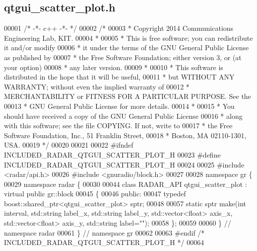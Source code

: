 \subsection{qtgui\+\_\+scatter\+\_\+plot.\+h}
\label{qtgui__scatter__plot_8h_source}

\begin{DoxyCode}
00001 \textcolor{comment}{/* -*- c++ -*- */}
00002 \textcolor{comment}{/* }
00003 \textcolor{comment}{ * Copyright 2014 Communications Engineering Lab, KIT.}
00004 \textcolor{comment}{ * }
00005 \textcolor{comment}{ * This is free software; you can redistribute it and/or modify}
00006 \textcolor{comment}{ * it under the terms of the GNU General Public License as published by}
00007 \textcolor{comment}{ * the Free Software Foundation; either version 3, or (at your option)}
00008 \textcolor{comment}{ * any later version.}
00009 \textcolor{comment}{ * }
00010 \textcolor{comment}{ * This software is distributed in the hope that it will be useful,}
00011 \textcolor{comment}{ * but WITHOUT ANY WARRANTY; without even the implied warranty of}
00012 \textcolor{comment}{ * MERCHANTABILITY or FITNESS FOR A PARTICULAR PURPOSE.  See the}
00013 \textcolor{comment}{ * GNU General Public License for more details.}
00014 \textcolor{comment}{ * }
00015 \textcolor{comment}{ * You should have received a copy of the GNU General Public License}
00016 \textcolor{comment}{ * along with this software; see the file COPYING.  If not, write to}
00017 \textcolor{comment}{ * the Free Software Foundation, Inc., 51 Franklin Street,}
00018 \textcolor{comment}{ * Boston, MA 02110-1301, USA.}
00019 \textcolor{comment}{ */}
00020 
00021 
00022 \textcolor{preprocessor}{#ifndef INCLUDED\_RADAR\_QTGUI\_SCATTER\_PLOT\_H}
00023 \textcolor{preprocessor}{#define INCLUDED\_RADAR\_QTGUI\_SCATTER\_PLOT\_H}
00024 
00025 \textcolor{preprocessor}{#include <radar/api.h>}
00026 \textcolor{preprocessor}{#include <gnuradio/block.h>}
00027 
00028 \textcolor{keyword}{namespace }gr \{
00029   \textcolor{keyword}{namespace }radar \{
00030 
00044     \textcolor{keyword}{class }RADAR_API qtgui_scatter_plot : \textcolor{keyword}{virtual} \textcolor{keyword}{public} gr::block
00045     \{
00046      \textcolor{keyword}{public}:
00047       \textcolor{keyword}{typedef} boost::shared\_ptr<qtgui\_scatter\_plot> sptr;
00048 
00057       \textcolor{keyword}{static} sptr make(\textcolor{keywordtype}{int} interval, std::string label\_x, std::string label\_y, std::vector<float> axis\_x, 
      std::vector<float> axis\_y, std::string label=\textcolor{stringliteral}{""});
00058     \};
00059 
00060   \} \textcolor{comment}{// namespace radar}
00061 \} \textcolor{comment}{// namespace gr}
00062 
00063 \textcolor{preprocessor}{#endif }\textcolor{comment}{/* INCLUDED\_RADAR\_QTGUI\_SCATTER\_PLOT\_H */}\textcolor{preprocessor}{}
00064 
\end{DoxyCode}
